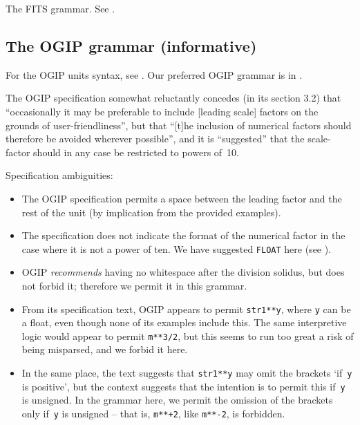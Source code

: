 \documentclass[11pt,a4paper]{ivoa}
\begin{document}
\clearpage
\begin{table}[t]

\caption[The FITS grammar]{\label{tabx:fitsgrammar}The FITS grammar.
See .}
\end{table}
\clearpage

\subsection{The OGIP grammar (informative)}
\label{appx:ogipgrammar}

For the OGIP units syntax, see \cite{george95}.  Our preferred OGIP
grammar is in .

The OGIP specification somewhat reluctantly concedes (in its section
3.2) that ``occasionally it may be preferable to include [leading
scale] factors on the grounds of user-friendliness'', but that ``[t]he
inclusion of numerical factors should therefore be avoided wherever
possible'', and it is ``suggested'' that the scale-factor should in any case
be restricted to powers of~10.

Specification ambiguities:
\begin{itemize}
\item The OGIP specification permits a space between the leading
  factor and the rest of the unit (by implication from the provided
  examples).
\item The specification does not indicate the format of the numerical
  factor in the case where it is not a power of ten.  We have
  suggested \texttt{FLOAT} here (see ).
\item OGIP \emph{recommends} having no whitespace after the division
  solidus, but does not forbid it; therefore we permit it in this
  grammar.
\item From its specification text, OGIP appears to permit
  \texttt{str1**y}, where \texttt{y} can be a float, even though none
  of its examples include this.  The same interpretive logic would
  appear to permit \texttt{m**3/2}, but this seems to run too great a
  risk of being misparsed, and we forbid it here.
\item In the same place, the text suggests that \texttt{str1**y} may
  omit the brackets `if~\texttt y is positive', but the context
  suggests that the intention is to permit this if~\texttt y is
  unsigned.  In the grammar here, we permit the omission of the
  brackets only if~\texttt y is unsigned -- that is, \texttt{m**+2},
  like \texttt{m**-2}, is forbidden.
\end{itemize}
\end{document}
